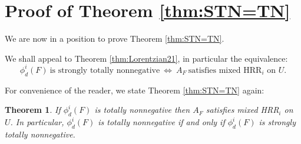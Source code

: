 \documentclass[unnumsec,webpdf,modern,medium]{oup-authoring-template}
\theoremstyle{theorem}
\newtheorem{theorem}{Theorem}[section]
\theoremstyle{definition}
\begin{document}
\section{Proof of Theorem \ref{thm:STN=TN}}
\label{sec:Theorem2}
We are now in a position to prove Theorem \ref{thm:STN=TN}.  






We shall appeal to Theorem \ref{thm:Lorentzian21}, in particular the equivalence:
$$\phi^i_d(F) \ \text{is strongly totally nonnegative} \ \Leftrightarrow \ A_F \ \text{satisfies mixed HRR$_i$ on $U$}.$$

For convenience of the reader, we state Theorem \ref{thm:STN=TN} again:
\begin{theorem}
	\label{thm:TNNSTNN}
	If $\phi^i_d(F)$ is totally nonnegative then $A_F$ satisfies mixed HRR$_i$ on $U$.  In particular, $\phi^i_d(F)$ is totally nonnegative if and only if $\phi^i_d(F)$ is strongly totally nonnegative.
\end{theorem}
\end{document}
